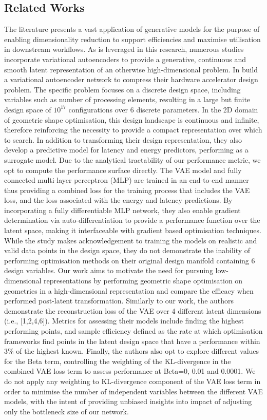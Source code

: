 \documentclass{article}
\begin{document}
\subsection{Related Works}
The literature presents a vast application of generative models for the purpose of enabling dimensionality reduction to support efficiencies and maximise utilisation in downstream workflows. As is leveraged in this research, numerous studies incorporate variational autoencoders to provide a generative, continuous and smooth latent representation of an otherwise high-dimensional problem. In \cite{Huang2022} build a variational autoencoder network to compress their hardware accelerator design problem. The specific problem focuses on a discrete design space, including variables such as number of processing elements, resulting in a large but finite design space of $10^{17}$ configurations over 6 discrete parameters. In the 2D domain of geometric shape optimisation, this design landscape is continuous and infinite, therefore reinforcing the necessity to provide a compact representation over which to search. In addition to transforming their design representation, they also develop a predictive model for latency and energy predictors, performing as a surrogate model. Due to the analytical tractability of our performance metric, we opt to compute the performance surface directly. The VAE model and fully connected multi-layer perceptron (MLP) are trained in an end-to-end manner thus providing a combined loss for the training process that includes the VAE loss, and the loss associated with the energy and latency predictions. By incorporating a fully differentiable MLP network, they also enable gradient determination via auto-differentiation to provide a performance function over the latent space, making it interfaceable with gradient based optimisation techniques. While the study makes acknowledgement to training the models on realistic and valid data points in the design space, they do not demonstrate the inability of performing optimisation methods on their original design manifold containing 6 design variables. Our work aims to motivate the need for pursuing low-dimensional representations by performing geometric shape optimisation on geometries in a high-dimensional representation and compare the efficacy when performed post-latent transformation. Similarly to our work, the authors demonstrate the reconstruction loss of the VAE over 4 different latent dimensions (i.e., [1,2,4,6]). Metrics for assessing their models include finding the highest performing points, and sample efficiency defined as the rate at which optimisation frameworks find points in the latent design space that have a performance within 3\% of the highest known. Finally, the authors also opt to explore different values for the Beta term, controlling the weighting of the KL-divergence in the combined VAE loss term to assess performance at Beta=0, 0.01 and 0.0001. We do not apply any weighting to KL-divergence component of the VAE loss term in order to minimise the number of independent variables between the different VAE models, with the intent of providing unbiased insights into impact of adjusting only the bottleneck size of our network.
\end{document}
